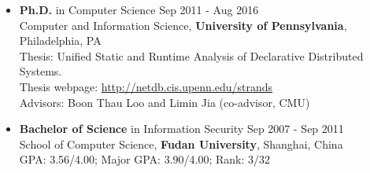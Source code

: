 \begin{itemize}
\item {\bf Ph.D.} in Computer Science \hfill Sep 2011 - Aug 2016\\
Computer and Information Science, {\bf University of Pennsylvania}, Philadelphia, PA  \\  
Thesis: Unified Static and Runtime Analysis of Declarative Distributed Systems.\\
Thesis webpage: \url{http://netdb.cis.upenn.edu/strands}\\
Advisors: Boon Thau Loo and Limin Jia (co-advisor, CMU) \\

\item {\bf Bachelor of Science} in Information Security \hfill Sep 2007 - Sep 2011\\
School of Computer Science,
{\bf Fudan University}, Shanghai, China  \\
GPA: 3.56/4.00; Major GPA: 3.90/4.00; Rank: 3/32
\end{itemize}
